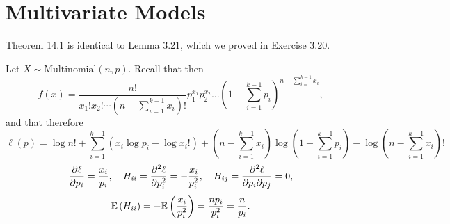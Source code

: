 \chapter{Multivariate Models}

\begin{ex}
  Theorem 14.1 is identical to Lemma 3.21, which we proved in Exercise 3.20.
\end{ex}

\begin{ex}
  Let $X\sim\text{Multinomial}(n, p)$. Recall that then
  \[
    f(x)=\frac{n!}{x_1!x_2!\cdots (n-\sum_{i=1}^{k-1}x_i)!}p_1^{x_1}p_2^{x_2}\ldots (1-\sum_{i=1}^{k-1}p_i)^{n-\sum_{i=1}^{k-1}x_i},
  \]
  and that therefore
  \[
    \ell(p)
    =\log{n!}
    +\sum_{i=1}^{k-1}(x_i\log{p_i} - \log{x_i!})
    +\left(n-\sum_{i=1}^{k-1}x_i\right)\log\left(1-\sum_{i=1}^{k-1}p_i\right)
    -\log\left(n-\sum_{i=1}^{k-1}x_i\right)!
  \]
  \[
    \frac{\partial \ell}{\partial p_i}=\frac{x_i}{p_i},\quad
    H_{ii}=\frac{\partial^2 \ell}{\partial p_i^2}=-\frac{x_i}{p^2_i},\quad
    H_{ij}=\frac{\partial^2 \ell}{\partial p_i\partial p_j}=0,
  \]
  \[
    \mathbb{E}\left(H_{ii}\right)=-\mathbb{E}\left(\frac{x_i}{p^2_i}\right)=\frac{np_i}{p_i^2}=\frac{n}{p_i}.
  \]
\end{ex}

\begin{ex}~
  \inputminted{python}{../code/ex14_03.py}
\end{ex}

\begin{ex}~
  \inputminted{python}{../code/ex14_04.py}
\end{ex}

\begin{ex}~
  \inputminted{python}{../code/ex14_05.py}
  \inputminted{text}{../output/ex14_05.txt}
\end{ex}

\begin{ex}~
  \inputminted{python}{../code/ex14_06.py}
  \inputminted{text}{../output/ex14_06.txt}
\end{ex}